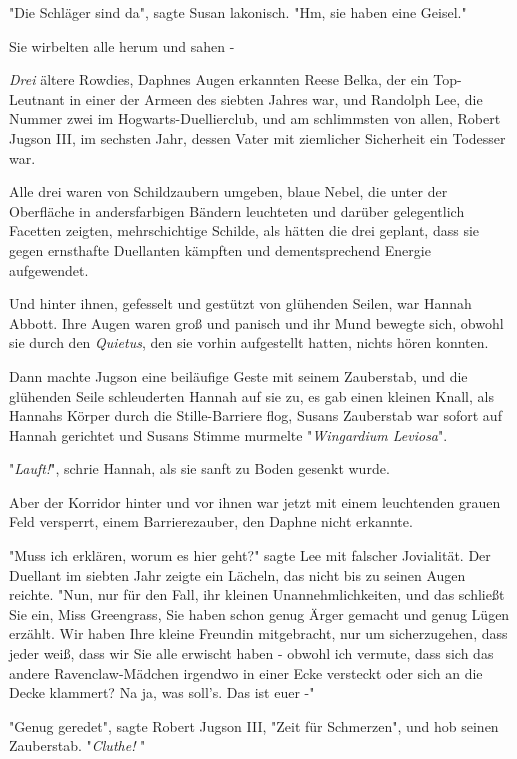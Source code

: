 {"Die Schläger sind da", sagte Susan lakonisch. "Hm, sie haben eine Geisel."

Sie wirbelten alle herum und sahen -

\emph{Drei} ältere Rowdies, Daphnes Augen erkannten Reese Belka, der ein Top-Leutnant in einer der Armeen des siebten Jahres war, und Randolph Lee, die Nummer zwei im Hogwarts-Duellierclub, und am schlimmsten von allen, Robert Jugson III, im sechsten Jahr, dessen Vater mit ziemlicher Sicherheit ein Todesser war.

Alle drei waren von Schildzaubern umgeben, blaue Nebel, die unter der Oberfläche in andersfarbigen Bändern leuchteten und darüber gelegentlich Facetten zeigten, mehrschichtige Schilde, als hätten die drei geplant, dass sie gegen ernsthafte Duellanten kämpften und dementsprechend Energie aufgewendet.

Und hinter ihnen, gefesselt und gestützt von glühenden Seilen, war Hannah Abbott. Ihre Augen waren groß und panisch und ihr Mund bewegte sich, obwohl sie durch den \emph{Quietus}, den sie vorhin aufgestellt hatten, nichts hören konnten.

Dann machte Jugson eine beiläufige Geste mit seinem Zauberstab, und die glühenden Seile schleuderten Hannah auf sie zu, es gab einen kleinen Knall, als Hannahs Körper durch die Stille-Barriere flog, Susans Zauberstab war sofort auf Hannah gerichtet und Susans Stimme murmelte "\emph{Wingardium Leviosa}".

"\emph{Lauft!}", schrie Hannah, als sie sanft zu Boden gesenkt wurde.

Aber der Korridor hinter und vor ihnen war jetzt mit einem leuchtenden grauen Feld versperrt, einem Barrierezauber, den Daphne nicht erkannte.

"Muss ich erklären, worum es hier geht?" sagte Lee mit falscher Jovialität. Der Duellant im siebten Jahr zeigte ein Lächeln, das nicht bis zu seinen Augen reichte. "Nun, nur für den Fall, ihr kleinen Unannehmlichkeiten, und das schließt Sie ein, Miss Greengrass, Sie haben schon genug Ärger gemacht und genug Lügen erzählt. Wir haben Ihre kleine Freundin mitgebracht, nur um sicherzugehen, dass jeder weiß, dass wir Sie alle erwischt haben - obwohl ich vermute, dass sich das andere Ravenclaw-Mädchen irgendwo in einer Ecke versteckt oder sich an die Decke klammert? Na ja, was soll's. Das ist euer -"

"Genug geredet", sagte Robert Jugson III, "Zeit für Schmerzen", und hob seinen Zauberstab. "\emph{Cluthe!} "

}
